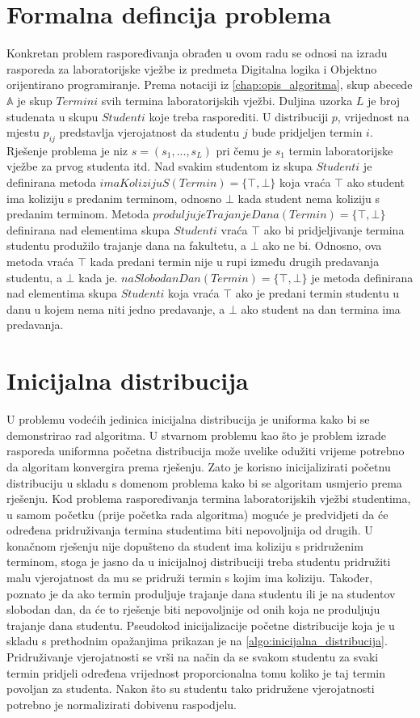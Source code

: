 \documentclass[times, utf8, zavrsni]{fer}
\begin{document}
\section{Formalna defincija problema}
Konkretan problem raspoređivanja obrađen u ovom radu se odnosi na izradu rasporeda za laboratorijske vježbe iz predmeta Digitalna logika
i Objektno orijentirano programiranje. Prema notaciji iz \ref{chap:opis_algoritma}, skup abecede $\mathbb{A}$ je skup $Termini$ svih termina laboratorijskih
vježbi. Duljina uzorka $L$ je broj studenata u skupu $Studenti$ koje treba rasporediti. U distribuciji $p$, vrijednost na mjestu $p_{ij}$ predstavlja
vjerojatnost da studentu $j$ bude pridjeljen termin $i$. Rješenje problema je niz $s=(s_1,...,s_L)$ pri čemu je $s_1$ termin laboratorijske
vježbe za prvog studenta itd. Nad svakim studentom iz skupa $Studenti$ je definirana metoda $imaKolizijuS(Termin) =
\{\top, \bot \}$ koja vraća $\top$ ako student ima koliziju s predanim terminom, odnosno $\bot$ kada student nema koliziju
s predanim terminom. Metoda $produljujeTrajanjeDana(Termin) = \{\top, \bot \}$ definirana nad elementima skupa $Studenti$
vraća $\top$ ako bi pridjeljivanje termina studentu produžilo trajanje dana na fakultetu, a $\bot$ ako ne bi. Odnosno,
ova metoda vraća $\top$ kada predani termin nije u rupi između drugih predavanja studentu, a $\bot$ kada je.
$naSlobodanDan(Termin) = \{\top, \bot \}$ je metoda definirana nad elementima skupa $Studenti$ koja vraća $\top$ ako je
predani termin studentu u danu u kojem nema niti jedno predavanje, a $\bot$ ako student na dan termina ima predavanja.

\section{Inicijalna distribucija}
U problemu vodećih jedinica inicijalna distribucija je uniforma kako bi se demonstrirao rad algoritma. U stvarnom problemu kao što je problem izrade rasporeda
uniformna početna distribucija može uvelike odužiti vrijeme potrebno da algoritam konvergira prema rješenju. Zato je korisno inicijalizirati početnu distribuciju u skladu s
domenom problema kako bi se algoritam usmjerio prema rješenju. Kod problema raspoređivanja termina laboratorijskih vježbi studentima, u samom početku (prije početka rada
algoritma) moguće je predvidjeti da će određena pridruživanja termina studentima biti nepovoljnija od drugih. U konačnom rješenju nije dopušteno da student ima koliziju
s pridruženim terminom, stoga je jasno da u inicijalnoj distribuciji treba studentu pridružiti malu vjerojatnost da mu se pridruži termin s kojim ima koliziju. Također,
poznato je da ako termin produljuje trajanje dana studentu ili je na studentov slobodan dan, da će to rješenje biti nepovoljnije od onih koja ne produljuju trajanje dana
studentu. Pseudokod inicijalizacije početne distribucije koja je u skladu s prethodnim opažanjima prikazan je na \ref{algo:inicijalna_distribucija}. Pridruživanje vjerojatnosti se
vrši na način da se svakom studentu za svaki termin pridjeli određena vrijednost proporcionalna tomu koliko je taj termin povoljan za studenta. Nakon što su studentu tako
pridružene vjerojatnosti potrebno je normalizirati dobivenu raspodjelu.
\end{document}
